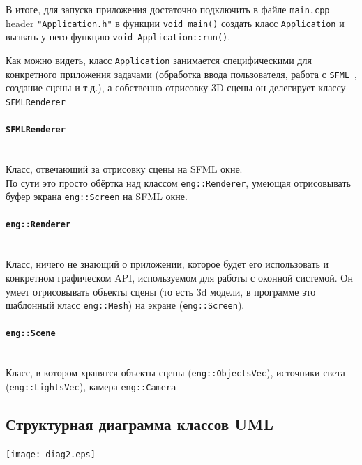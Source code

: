 \documentclass{article}
\begin{document}
В итоге, для запуска приложения достаточно подключить в файле \texttt{main.cpp} header \texttt{"Application.h"} в функции \texttt{void main()} создать класс \texttt{Application} и вызвать у него функцию \texttt{void Application::run()}. 

Как можно видеть, класс \texttt{Application} занимается специфическими для конкретного приложения задачами (обработка ввода пользователя, работа с \texttt{SFML}~\cite{sfml}, создание сцены и т.д.), а собственно отрисовку 3D сцены он делегирует классу \texttt{SFMLRenderer}

\paragraph{\texttt{SFMLRenderer}}
$\text{}$\\
Класс, отвечающий за отрисовку сцены на SFML окне. \\
По сути это просто обёртка над классом \texttt{eng::Renderer}, умеющая отрисовывать буфер экрана \texttt{eng::Screen} на SFML окне.

\paragraph{\texttt{eng::Renderer}}
$\text{}$\\
Класс, ничего не знающий о приложении, которое будет его использовать и конкретном графическом API, используемом для работы с оконной системой. Он умеет отрисовывать объекты сцены (то есть 3d модели, в программе это шаблонный класс \texttt{eng::Mesh}) на экране (\texttt{eng::Screen}).

\paragraph{\texttt{eng::Scene}}
$\text{}$\\
Класс, в котором хранятся объекты сцены (\texttt{eng::ObjectsVec}), источники света (\texttt{eng::LightsVec}), камера \texttt{eng::Camera}

\subsection{Структурная диаграмма классов UML}
\texttt{[image: diag2.eps]}
\end{document}
